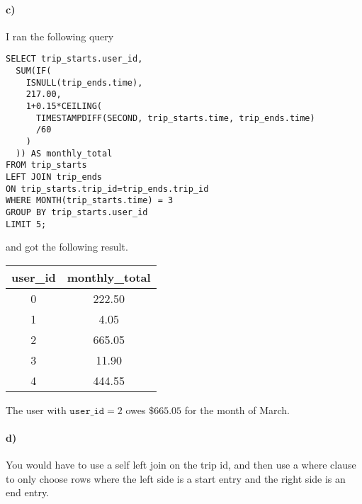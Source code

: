 \documentclass[12pt]{article}
\begin{document}
\paragraph{c)}

I ran the following query
\begin{verbatim}
SELECT trip_starts.user_id,
  SUM(IF(
    ISNULL(trip_ends.time),
    217.00,
    1+0.15*CEILING(
      TIMESTAMPDIFF(SECOND, trip_starts.time, trip_ends.time)
      /60
    )
  )) AS monthly_total
FROM trip_starts
LEFT JOIN trip_ends
ON trip_starts.trip_id=trip_ends.trip_id
WHERE MONTH(trip_starts.time) = 3
GROUP BY trip_starts.user_id
LIMIT 5;
\end{verbatim}
and got the following result.
\begin{center}
        \begin{tabular}{c|c}
                user\_id & monthly\_total\\
                \hline
                0 & 222.50\\
                1 & 4.05\\
                2 & 665.05\\
                3 & 11.90\\
                4 & 444.55
        \end{tabular}
\end{center}
The user with \(\texttt{user\_id}=2\) owes \(\$665.05\) for the month of March.

\paragraph{d)}

You would have to use a self left join on the trip id, and then use a where clause to only choose rows
where the left side is a start entry and the right side is an end entry.
\end{document}
